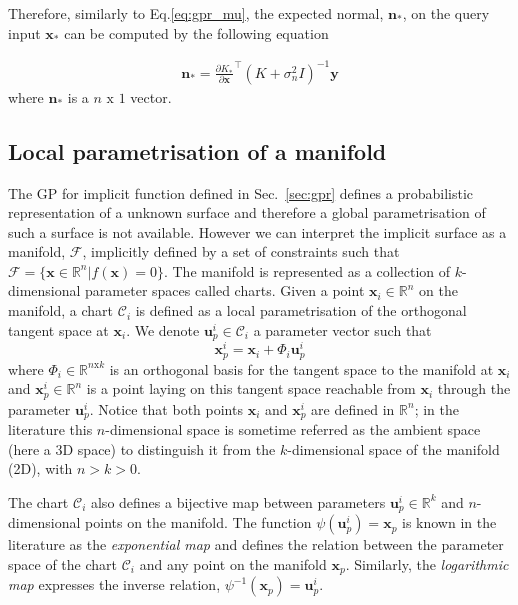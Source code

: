 Therefore, similarly to Eq.\ref{eq:gpr_mu}, the expected normal, $\mathbf{n}_*$, on the query input $\mathbf{x}_*$ can be computed by the following equation

\begin{eqnarray}
\label{eq:gpr_n}
\mathbf{n}_*=\frac{\partial K_*}{\partial\mathbf{x}}^\top(K+\sigma_n^2I)^{-1}\mathbf{y}
\end{eqnarray}
where $\mathbf{n}_*$ is a $n\text{ x }1$ vector.

\subsection{Local parametrisation of a manifold}\label{sec:atlas}


The GP for implicit function defined in Sec.~\ref{sec:gpr} defines a probabilistic representation of a unknown surface and therefore a global parametrisation of such a surface is not available. However we can interpret the implicit surface as a manifold, $\mathcal{F}$, implicitly defined by a set of constraints such that $\mathcal{F}=\{\mathbf{x}\in\mathbb{R}^n|f(\mathbf{x})=0\}$. The manifold is represented as a collection of $k$-dimensional parameter spaces called charts.
Given a point $\mathbf{x}_i\in\mathbb{R}^n$ on the manifold, a chart $\mathcal{C}_i$ is defined as a local parametrisation of the orthogonal tangent space at $\mathbf{x}_i$. We denote $\mathbf{u}_p^i\in\mathcal{C}_i$ a parameter vector such that 
\begin{equation}
\label{eq:psi}
\mathbf{x}_p^i=\mathbf{x}_i+\Phi_i\mathbf{u}_p^i
\end{equation}
where $\Phi_i\in\mathbb{R}^{n\text{x}k}$ is an orthogonal basis for the tangent space to the manifold at $\mathbf{x}_i$ and $\mathbf{x}_p^i\in\mathbb{R}^n$ is a point laying on this tangent space reachable from $\mathbf{x}_i$ through the parameter $\mathbf{u}_p^i$. Notice that both points $\mathbf{x}_i$ and $\mathbf{x}_p^i$ are defined in $\mathbb{R}^n$; in the literature this $n$-dimensional space is sometime referred as the ambient space (here a 3D space) to distinguish it from the $k$-dimensional space of the manifold (2D), with $n > k > 0$.

The chart $\mathcal{C}_i$ also defines a bijective map between parameters $\mathbf{u}_p^i\in\mathbb{R}^k$ and $n$-dimensional points on the manifold. The function $\psi(\mathbf{u}_p^i)=\mathbf{x}_p$ is known in the literature as the \emph{exponential map} and defines the relation between the parameter space of the chart $\mathcal{C}_i$ and any point on the manifold $\mathbf{x}_p$. Similarly, the \emph{logarithmic map} expresses the inverse relation, $\psi^{-1}(\mathbf{x}_p)= \mathbf{u}_p^i$.

